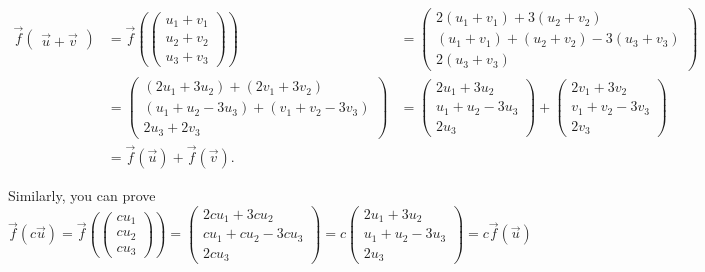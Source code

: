 \documentclass{article}
\begin{document}
\begin{align*}
\vec{f}\begin{pmatrix}
 \Vec{u}+\Vec{v}
\end{pmatrix} &=
\vec{f}\left(\begin{pmatrix}
 u_1 + v_1\\
 u_2 + v_2\\
 u_3 + v_3
\end{pmatrix}\right) &=
\begin{pmatrix}
 2(u_1 + v_1) + 3(u_2 + v_2)\\
 (u_1 + v_1) + (u_2 + v_2) - 3(u_3 + v_3)\\
 2(u_3 + v_3)
\end{pmatrix}\\
&= \begin{pmatrix}
(2u_1 + 3u_2) + (2v_1 + 3v_2)\\
(u_1 + u_2 - 3u_3) + (v_1 + v_2 - 3v_3)\\
2u_3 + 2v_3
\end{pmatrix} &= \begin{pmatrix}
2u_1 + 3u_2\\
u_1 + u_2 - 3u_3\\
2u_3 
\end{pmatrix}+\begin{pmatrix}
2v_1 + 3v_2\\
v_1 + v_2 - 3v_3\\
2v_3
\end{pmatrix}\\
&= \vec{f}(\Vec{u}) + \vec{f}(\Vec{v}).
\end{align*}

Similarly, you can prove 
\[
\vec{f}(c\Vec{u}) = 
\vec{f}\left(\begin{pmatrix}
cu_1\\
cu_2\\
cu_3
\end{pmatrix}\right)=
\begin{pmatrix}
 2cu_1 + 3cu_2\\
 cu_1 + cu_2 - 3cu_3\\
 2cu_3
\end{pmatrix}=
c\begin{pmatrix}
 2u_1 + 3u_2\\
 u_1 + u_2 - 3u_3\\
 2u_3
\end{pmatrix}=
c\vec{f}(\Vec{u})
\]
\end{document}

